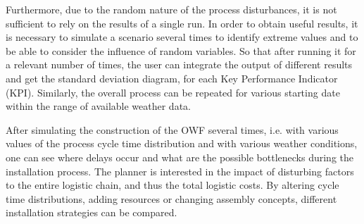 Furthermore, due to the random nature of the process disturbances, it is not sufficient to rely on the results of a single run. In order to obtain useful results, it is necessary to simulate a scenario several times to identify extreme values and to be able to consider the influence of random variables. So that after running it for a relevant number of times, the user can integrate the output of different results and get the standard deviation diagram, for each Key Performance Indicator (KPI). Similarly, the overall process can be repeated for various starting date within the range of available weather data.

After simulating the construction of the OWF several times, i.e. with various values of the process cycle time distribution and with various weather conditions, one can see where delays occur and what are the possible bottlenecks during the installation process. The planner is interested in the impact of disturbing factors to the entire logistic chain, and thus the total logistic costs. By altering cycle time distributions, adding resources or changing assembly concepts, different installation strategies can be compared.